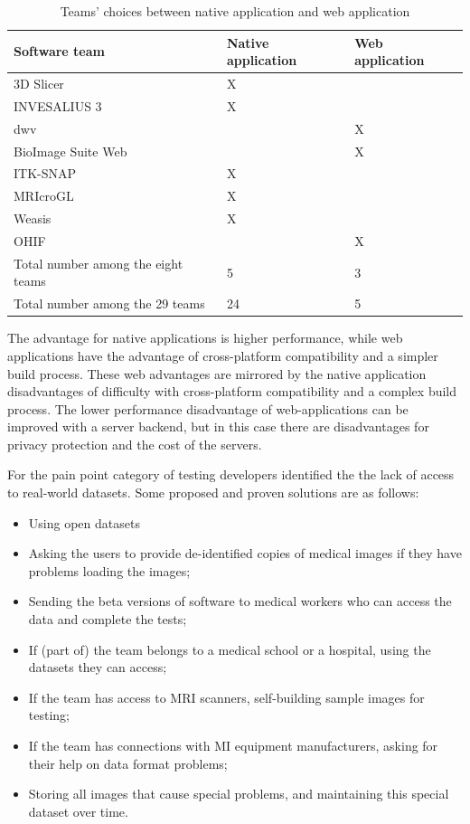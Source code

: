 \documentclass[final, 3p, times, authoryear]{elsarticle}
\begin{document}
\begin{table}[!ht]
\centering
\begin{tabular}{lll}
\hline
Software team & Native application & Web application \\ \hline
3D Slicer & X & \\
INVESALIUS 3 & X & \\
dwv & & X \\
BioImage Suite Web & & X \\
ITK-SNAP & X & \\
MRIcroGL & X & \\
Weasis & X & \\
OHIF & & X \\ \hdashline
Total number among the eight teams & 5 & 3 \\
Total number among the 29 teams & 24 & 5 \\ \hline
\end{tabular}
\caption{\label{tab_native_vs_web}Teams' choices between native application and
web application}
\end{table}

The advantage for native applications is higher performance, while web
applications have the advantage of cross-platform compatibility and a simpler
build process.  These web advantages are mirrored by the native application
disadvantages of difficulty with cross-platform compatibility and a complex
build process.  The lower performance disadvantage of web-applications can be
improved with a server backend, but in this case there are disadvantages for
privacy protection and the cost of the servers.

For the pain point category of testing developers identified the the lack of access to
real-world datasets.  Some proposed and proven solutions are as follows:

\begin{itemize}
\item Using open datasets
\item Asking the users to provide de-identified copies of medical images if they
have problems loading the images;
\item Sending the beta versions of software to medical workers who can access
the data and complete the tests;
\item If (part of) the team belongs to a medical school or a hospital, using the
datasets they can access;
\item If the team has access to MRI scanners, self-building sample images for
testing;
\item If the team has connections with MI equipment manufacturers, asking for
their help on data format problems;
\item Storing all images that cause special problems, and maintaining this
special dataset over time.
\end{itemize}
\end{document}
